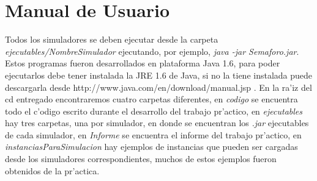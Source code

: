 \section{Manual de Usuario}
Todos los simuladores se deben ejecutar desde la carpeta \emph{ejecutables/NombreSimulador} ejecutando, por ejemplo, \emph{java -jar Semaforo.jar}. Estos programas fueron desarrollados en plataforma Java 1.6, para poder ejecutarlos debe tener instalada la JRE 1.6 de Java, si no la tiene instalada puede descargarla desde http://www.java.com/en/download/manual.jsp .
En la ra'iz del cd entregado encontraremos cuatro carpetas diferentes, en \emph{codigo} se encuentra todo el c'odigo escrito durante el desarrollo del trabajo pr'actico, en \emph{ejecutables} hay tres carpetas, una por simulador, en donde se encuentran los \emph{.jar} ejecutables de cada simulador, en \emph{Informe} se encuentra el informe del trabajo pr'actico, en \emph{instanciasParaSimulacion} hay ejemplos de instancias que pueden ser cargadas desde los simuladores correspondientes, muchos de estos ejemplos fueron obtenidos de la pr'actica.

